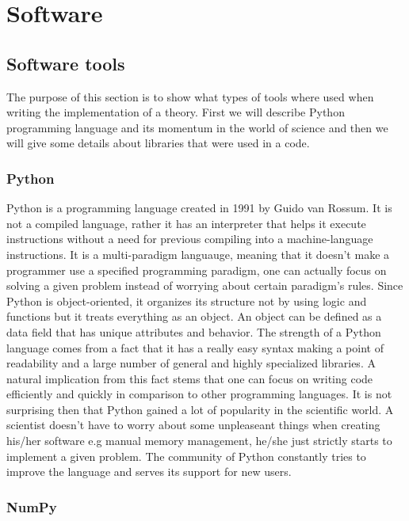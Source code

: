 \documentclass[a4paper,oneside,openright,11pt]{book}
\begin{document}
\chapter{Software}

\section{Software tools}

The purpose of this section is to show what types of tools where used when writing the implementation of a theory. First we will describe Python programming language and its momentum in the world of science and then we will give some details about libraries that were used in a code.

\subsection{Python }

Python \cite{Python} is a programming language created in 1991 by Guido van Rossum. It is not a compiled language, rather it has an interpreter that helps it execute instructions without a need for previous compiling into a machine-language instructions. It is a multi-paradigm languauge, meaning that it doesn't make a programmer use a specified programming paradigm, one can actually focus on solving a given problem instead of worrying about certain paradigm's rules. Since Python is object-oriented, it organizes its structure not by using logic and functions but it treats everything as an object. An object can be defined as a data field that has unique attributes and behavior. The strength of a Python language comes from a fact that it has a really easy syntax making a point of readability and a large number of general and highly specialized libraries. A natural implication from this fact stems that one can focus on writing code efficiently and quickly in comparison to other programming languages. It is not surprising then that Python gained a lot of popularity in the scientific world. A scientist doesn't have to worry about some unpleaseant things when creating his/her software e.g manual memory management, he/she just strictly starts to implement a given problem. The community of Python constantly tries to improve the language and serves its support for new users.

\subsection{NumPy}
\end{document}
